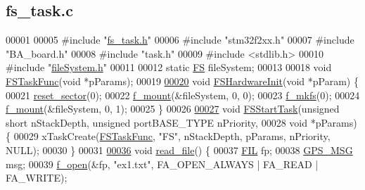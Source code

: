 \hypertarget{fs__task_8c_source}{\subsection{fs\+\_\+task.\+c}
\label{fs__task_8c_source}
}

\begin{DoxyCode}
00001 
00005 \textcolor{preprocessor}{#include "\hyperlink{fs__task_8h}{fs\_task.h}"}
00006 \textcolor{preprocessor}{#include "stm32f2xx.h"}
00007 \textcolor{preprocessor}{#include "BA\_board.h"}
00008 \textcolor{preprocessor}{#include "task.h"}
00009 \textcolor{preprocessor}{#include <stdlib.h>}
00010 \textcolor{preprocessor}{#include "\hyperlink{fileSystem_8h}{fileSystem.h}"}
00011 
00012 \textcolor{keyword}{static} \hyperlink{structFS}{FS} fileSystem;
00013 
00018 \textcolor{keywordtype}{void} \hyperlink{fs__task_8c_a941f5a214539980b9c21487c9e598ed1}{FSTaskFunc}(\textcolor{keywordtype}{void} *pParams);
00019 
\hypertarget{fs__task_8c_source_l00020}{}\hyperlink{fs__task_8h_ab7f1e7392ed5dbe6c58be74746987f99}{00020} \textcolor{keywordtype}{void} \hyperlink{fs__task_8c_ab7f1e7392ed5dbe6c58be74746987f99}{FSHardwareInit}(\textcolor{keywordtype}{void} *pParam) \{
00021   \hyperlink{fileSystem_8c_afcfe716c836b3b8a019fa38faf56da96}{reset\_sector}(0);
00022   \hyperlink{fileSystem_8c_a06b1816d729a1ee702209d4ddc1d91af}{f\_mount}(&fileSystem, 0, 0);
00023   \hyperlink{fileSystem_8c_a8e75c990b2a6c64fa783c75aace55059}{f\_mkfs}(0);
00024   \hyperlink{fileSystem_8c_a06b1816d729a1ee702209d4ddc1d91af}{f\_mount}(&fileSystem, 0, 1);
00025 \}
00026 
\hypertarget{fs__task_8c_source_l00027}{}\hyperlink{fs__task_8h_a67c975ae61cf5db912f17b454b2713c7}{00027} \textcolor{keywordtype}{void} \hyperlink{fs__task_8c_a67c975ae61cf5db912f17b454b2713c7}{FSStartTask}(\textcolor{keywordtype}{unsigned} \textcolor{keywordtype}{short} nStackDepth, \textcolor{keywordtype}{unsigned} portBASE\_TYPE nPriority,
00028     \textcolor{keywordtype}{void} *pParams) \{
00029   xTaskCreate(\hyperlink{fs__task_8c_a941f5a214539980b9c21487c9e598ed1}{FSTaskFunc}, \textcolor{stringliteral}{"FS"}, nStackDepth, pParams, nPriority, NULL);
00030 \}
00031 
\hypertarget{fs__task_8c_source_l00036}{}\hyperlink{fs__task_8c_a7b35ce27806462ceb0681745fc16ed0b}{00036} \textcolor{keywordtype}{void} \hyperlink{fs__task_8c_a7b35ce27806462ceb0681745fc16ed0b}{read\_file}() \{
00037   \hyperlink{structFIL}{FIL} fp;
00038   \hyperlink{structGPS__MSG}{GPS\_MSG} msg;
00039   \hyperlink{fileSystem_8c_aefdef7126128d99d0b3bd82c28e54d80}{f\_open}(&fp, \textcolor{stringliteral}{"ex1.txt"}, FA\_OPEN\_ALWAYS | FA\_READ | FA\_WRITE);

\end{DoxyCode}
